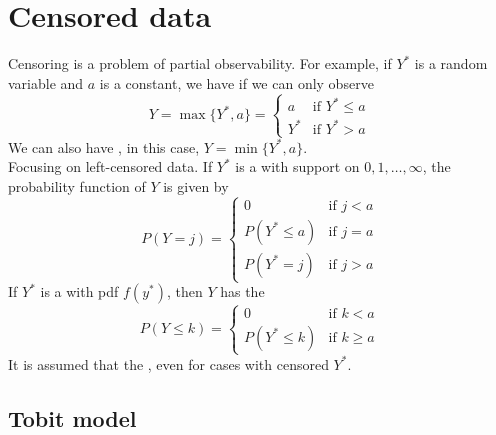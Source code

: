 \section{Censored data}

Censoring is a problem of partial observability.
For example, if $Y^*$ is a random variable and $a$ is a constant, we have  if we can only observe 
\begin{equation*}
    Y = \max\{Y^*,a\} = \begin{cases}
        a & \text{if }Y^* \leq a\\
        Y^* & \text{if }Y^* > a
    \end{cases}
\end{equation*}
We can also have , in this case, $Y = \min\{Y^*,a\}$.\\

Focusing on left-censored data.
If $Y^*$ is a  with support on $0,1,\ldots,\infty$, the probability function of $Y$ is given by 
\begin{equation*}
    P(Y=j) = \begin{cases}
        0 & \text{if }j<a\\
        P(Y^*\leq a) & \text{if }j=a\\
        P(Y^* = j) & \text{if }j>a
    \end{cases}
\end{equation*}
If $Y^*$ is a  with pdf $f(y^*)$, then $Y$ has the  
\begin{equation*}
    P(Y\leq k) = \begin{cases}
        0 & \text{if }k<a\\
        P(Y^*\leq k) & \text{if }k\geq a
    \end{cases}
\end{equation*}
It is assumed that the , even for cases with censored $Y^*$.

\subsection{Tobit model}

